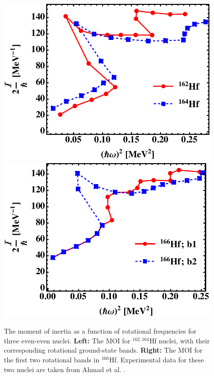 \begin{figure}
    \centering
    \includegraphics[scale=0.51]{Chapters/Figures/mois_Hf162-164.pdf}
    \includegraphics[scale=0.52]{Chapters/Figures/mois_Hf166.pdf}
    \caption{The moment of inertia as a function of rotational frequencies for three even-even nuclei. \textbf{Left:} The MOI for $^{162,164}$Hf nuclei, with their corresponding rotational ground-state bands. \textbf{Right:} The MOI for the first two rotational bands in $^{166}$Hf. Experimental data for these two nuclei are taken from Ahmad et al. \cite{ahmad2021backbending}.}
    \label{fig-hfNuclei-mois}
\end{figure}

